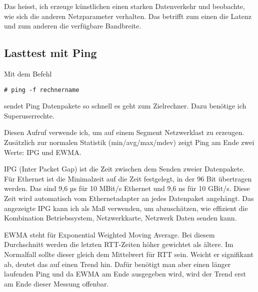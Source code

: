 \begin{normaltext}
  Das heisst, ich erzeuge künstlichen einen starken Datenverkehr und
  beobachte, wie sich die anderen Netzparameter verhalten. Das betrifft zum
  einen die Latenz und zum anderen die verfügbare Bandbreite.
  \subsection{Lasttest mit Ping}
  Mit dem Befehl
  \begin{verbatim}
# ping -f rechnername
  \end{verbatim}
  sendet Ping Datenpakete so schnell es geht zum Zielrechner. Dazu benötige
  ich Superuserrechte.

  Diesen Aufruf verwende ich, um auf einem Segment Netzwerklast zu erzeugen.
  Zusätzlich zur normalen Statistik (min/avg/max/mdev) zeigt Ping am Ende zwei
  Werte: IPG und EWMA.

  IPG (Inter Packet Gap) ist die Zeit zwischen dem Senden zweier Datenpakete.
  Für Ethernet ist die Minimalzeit auf die Zeit festgelegt, in der 96 Bit
  übertragen werden. Das sind 9,6 µs für 10 MBit/s Ethernet und 9,6 ns für 10
  GBit/s. Diese Zeit wird automatisch vom Ethernetadapter an jedes Datenpaket
  angehängt. Das angezeigte IPG kann ich als Maß verwenden, um abzuschätzen,
  wie effizient die Kombination Betriebssystem, Netzwerkkarte, Netzwerk Daten
  senden kann.

  EWMA steht für Exponential Weighted Moving Average. Bei diesem Durchschnitt
  werden die letzten  RTT-Zeiten höher gewichtet als ältere. Im Normalfall
  sollte dieser gleich dem Mittelwert für RTT sein. Weicht er signifikant ab,
  deutet das auf einen Trend hin. Dafür benötigt man aber einen länger
  laufenden Ping und da EWMA am Ende ausgegeben wird, wird der Trend erst am
  Ende dieser Messung offenbar.
\end{normaltext}





